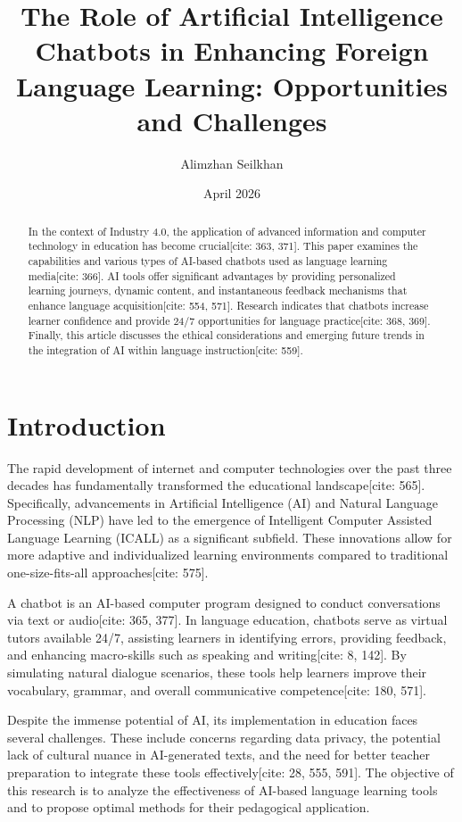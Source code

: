 \documentclass{article}
\title{The Role of Artificial Intelligence Chatbots in Enhancing Foreign Language Learning: Opportunities and Challenges}
\author{Alimzhan Seilkhan}
\date{April 2026}
\begin{document}
\maketitle

\begin{abstract}
In the context of Industry 4.0, the application of advanced information and computer technology in education has become crucial[cite: 363, 371]. This paper examines the capabilities and various types of AI-based chatbots used as language learning media[cite: 366]. AI tools offer significant advantages by providing personalized learning journeys, dynamic content, and instantaneous feedback mechanisms that enhance language acquisition[cite: 554, 571]. Research indicates that chatbots increase learner confidence and provide 24/7 opportunities for language practice[cite: 368, 369]. Finally, this article discusses the ethical considerations and emerging future trends in the integration of AI within language instruction[cite: 559].
\end{abstract}

\section{Introduction}

The rapid development of internet and computer technologies over the past three decades has fundamentally transformed the educational landscape[cite: 565]. Specifically, advancements in Artificial Intelligence (AI) and Natural Language Processing (NLP) have led to the emergence of Intelligent Computer Assisted Language Learning (ICALL) as a significant subfield. These innovations allow for more adaptive and individualized learning environments compared to traditional one-size-fits-all approaches[cite: 575].

A chatbot is an AI-based computer program designed to conduct conversations via text or audio[cite: 365, 377]. In language education, chatbots serve as virtual tutors available 24/7, assisting learners in identifying errors, providing feedback, and enhancing macro-skills such as speaking and writing[cite: 8, 142]. By simulating natural dialogue scenarios, these tools help learners improve their vocabulary, grammar, and overall communicative competence[cite: 180, 571].

Despite the immense potential of AI, its implementation in education faces several challenges. These include concerns regarding data privacy, the potential lack of cultural nuance in AI-generated texts, and the need for better teacher preparation to integrate these tools effectively[cite: 28, 555, 591]. The objective of this research is to analyze the effectiveness of AI-based language learning tools and to propose optimal methods for their pedagogical application.
\end{document}
